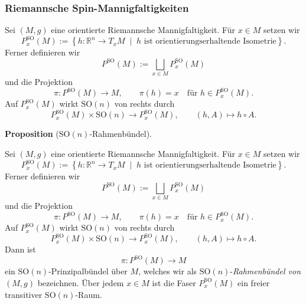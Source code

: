 \documentclass[10pt, letterpaper]{article}
\newcommand{\R}{\mathbb{R}}
\newcommand{\SO}{\mathrm{SO}}
\newcommand{\CustomHeading}[3]{%
  \par\medskip\noindent%
  \textbf{#1 #2} \textnormal{(#3)}.\enskip%
}
\newenvironment{PROP}[2]{\CustomHeading{Proposition}{#1}{#2}}{}
\begin{document}
\subsubsection{Riemannsche Spin-Mannigfaltigkeiten}


Sei $(M,g)$ eine orientierte Riemannsche Mannigfaltigkeit. Für \(x\in M\) setzen wir
\[
P_x^{\SO}(M)
:=
\left\{
h:\R^n\to T_xM
\;\middle|\;
h \text{ ist orientierungserhaltende Isometrie}
\right\}.
\]
Ferner definieren wir
\[
P^{\SO}(M):=\bigsqcup_{x\in M} P_x^{\SO}(M)
\]
und die Projektion
\[
\pi:P^{\SO}(M)\to M,\qquad \pi(h)=x
\quad\text{für }h\in P_x^{\SO}(M).
\]
Auf \(P_x^{\SO}(M)\) wirkt \(\SO(n)\) von rechts durch
\[
P_x^{\SO}(M)\times \SO(n)\to P_x^{\SO}(M),
\qquad
(h,A)\mapsto h\circ A.
\]

\begin{PROP}{}{$\SO(n)$-Rahmenbündel}
Sei $(M,g)$ eine orientierte Riemannsche Mannigfaltigkeit. Für \(x\in M\) setzen wir
\[
P_x^{\SO}(M)
:=
\left\{
h:\R^n\to T_xM
\;\middle|\;
h \text{ ist orientierungserhaltende Isometrie}
\right\}.
\]
Ferner definieren wir
\[
P^{\SO}(M):=\bigsqcup_{x\in M} P_x^{\SO}(M)
\]
und die Projektion
\[
\pi:P^{\SO}(M)\to M,\qquad \pi(h)=x
\quad\text{für }h\in P_x^{\SO}(M).
\]
Auf \(P_x^{\SO}(M)\) wirkt \(\SO(n)\) von rechts durch
\[
P_x^{\SO}(M)\times \SO(n)\to P_x^{\SO}(M),
\qquad
(h,A)\mapsto h\circ A.
\]
Dann ist
\[
\pi:P^{\SO}(M)\to M
\]
ein \(\SO(n)\)-Prinzipalbündel über $M$, welches wir als $\SO(n)$-\emph{Rahmenbündel von $(M,g)$} bezeichnen. Über jedem \(x\in M\) ist die Faser \(P_x^{\SO}(M)\) ein freier transitiver \(\SO(n)\)-Raum.
\end{PROP}
\end{document}
